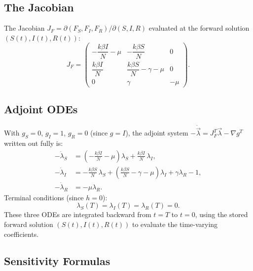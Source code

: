 \subsection{The Jacobian}

The Jacobian $J_F = \partial(F_S, F_I, F_R)/\partial(S, I, R)$ evaluated
at the forward solution $(S(t), I(t), R(t))$:
\begin{equation}
  J_F =
  \begin{pmatrix}
    -\dfrac{k\beta I}{N} - \mu & -\dfrac{k\beta S}{N} & 0 \\[8pt]
     \dfrac{k\beta I}{N} & \dfrac{k\beta S}{N} - \gamma - \mu & 0 \\[8pt]
    0 & \gamma & -\mu
  \end{pmatrix}.
  \label{eq:sirJacobian}
\end{equation}

\subsection{Adjoint ODEs}

With $g_S = 0$, $g_I = 1$, $g_R = 0$ (since $g = I$),
the adjoint system $-\dot{\vec{\lambda}} = J_F^T\vec{\lambda} - \nabla g^T$
written out fully is:
\begin{align}
  -\dot{\lambda}_S &= \left(-\frac{k\beta I}{N} - \mu\right)\lambda_S
                     + \frac{k\beta I}{N}\,\lambda_I, \label{eq:adj_S}\\[4pt]
  -\dot{\lambda}_I &= -\frac{k\beta S}{N}\,\lambda_S
                     + \left(\frac{k\beta S}{N} - \gamma - \mu\right)\lambda_I
                     + \gamma\lambda_R - 1, \label{eq:adj_I}\\[4pt]
  -\dot{\lambda}_R &= -\mu\lambda_R. \label{eq:adj_R}
\end{align}
Terminal conditions (since $h = 0$):
\begin{equation}
  \lambda_S(T) = \lambda_I(T) = \lambda_R(T) = 0.
  \label{eq:sirTC}
\end{equation}
These three ODEs are integrated backward from $t=T$ to $t=0$,
using the stored forward solution $(S(t), I(t), R(t))$
to evaluate the time-varying coefficients.

\subsection{Sensitivity Formulas}

